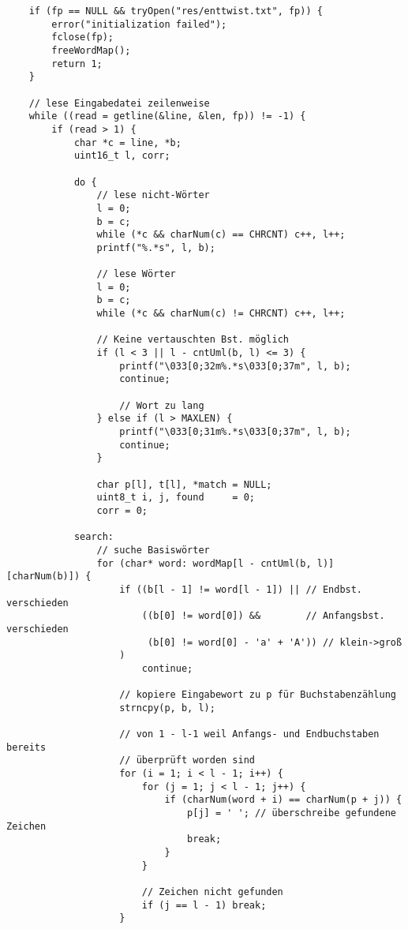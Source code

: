\documentclass[a4paper,10pt,ngerman]{scrartcl}
\begin{document}
\begin{lstlisting}
    if (fp == NULL && tryOpen("res/enttwist.txt", fp)) {
        error("initialization failed");
        fclose(fp);
        freeWordMap();
        return 1;
    }

    // lese Eingabedatei zeilenweise
    while ((read = getline(&line, &len, fp)) != -1) {
        if (read > 1) {
            char *c = line, *b;
            uint16_t l, corr;

            do {
                // lese nicht-Wörter
                l = 0;
                b = c;
                while (*c && charNum(c) == CHRCNT) c++, l++;
                printf("%.*s", l, b);

                // lese Wörter
                l = 0;
                b = c;
                while (*c && charNum(c) != CHRCNT) c++, l++;

                // Keine vertauschten Bst. möglich
                if (l < 3 || l - cntUml(b, l) <= 3) {
                    printf("\033[0;32m%.*s\033[0;37m", l, b);
                    continue;

                    // Wort zu lang
                } else if (l > MAXLEN) {
                    printf("\033[0;31m%.*s\033[0;37m", l, b);
                    continue;
                }

                char p[l], t[l], *match = NULL;
                uint8_t i, j, found     = 0;
                corr = 0;

            search:
                // suche Basiswörter
                for (char* word: wordMap[l - cntUml(b, l)][charNum(b)]) {
                    if ((b[l - 1] != word[l - 1]) || // Endbst. verschieden
                        ((b[0] != word[0]) &&        // Anfangsbst. verschieden
                         (b[0] != word[0] - 'a' + 'A')) // klein->groß
                    )
                        continue;

                    // kopiere Eingabewort zu p für Buchstabenzählung
                    strncpy(p, b, l);

                    // von 1 - l-1 weil Anfangs- und Endbuchstaben bereits
                    // überprüft worden sind
                    for (i = 1; i < l - 1; i++) {
                        for (j = 1; j < l - 1; j++) {
                            if (charNum(word + i) == charNum(p + j)) {
                                p[j] = ' '; // überschreibe gefundene Zeichen
                                break;
                            }
                        }

                        // Zeichen nicht gefunden
                        if (j == l - 1) break;
                    }


\end{lstlisting}
\end{document}
